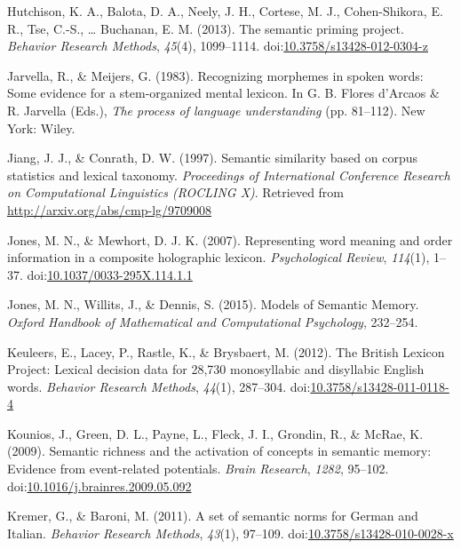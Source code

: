 \documentclass[english,,man]{apa6}
\begin{document}
\leavevmode\hypertarget{ref-Hutchison2013}{}%
Hutchison, K. A., Balota, D. A., Neely, J. H., Cortese, M. J., Cohen-Shikora, E. R., Tse, C.-S., \ldots{} Buchanan, E. M. (2013). The semantic priming project. \emph{Behavior Research Methods}, \emph{45}(4), 1099--1114. doi:\href{https://doi.org/10.3758/s13428-012-0304-z}{10.3758/s13428-012-0304-z}

\leavevmode\hypertarget{ref-Jarvella1983}{}%
Jarvella, R., \& Meijers, G. (1983). Recognizing morphemes in spoken words: Some evidence for a stem-organized mental lexicon. In G. B. Flores d'Arcaos \& R. Jarvella (Eds.), \emph{The process of language understanding} (pp. 81--112). New York: Wiley.

\leavevmode\hypertarget{ref-Jiang1997}{}%
Jiang, J. J., \& Conrath, D. W. (1997). Semantic similarity based on corpus statistics and lexical taxonomy. \emph{Proceedings of International Conference Research on Computational Linguistics (ROCLING X)}. Retrieved from \url{http://arxiv.org/abs/cmp-lg/9709008}

\leavevmode\hypertarget{ref-Jones2007}{}%
Jones, M. N., \& Mewhort, D. J. K. (2007). Representing word meaning and order information in a composite holographic lexicon. \emph{Psychological Review}, \emph{114}(1), 1--37. doi:\href{https://doi.org/10.1037/0033-295X.114.1.1}{10.1037/0033-295X.114.1.1}

\leavevmode\hypertarget{ref-Jones2015a}{}%
Jones, M. N., Willits, J., \& Dennis, S. (2015). Models of Semantic Memory. \emph{Oxford Handbook of Mathematical and Computational Psychology}, 232--254.

\leavevmode\hypertarget{ref-Keuleers2012}{}%
Keuleers, E., Lacey, P., Rastle, K., \& Brysbaert, M. (2012). The British Lexicon Project: Lexical decision data for 28,730 monosyllabic and disyllabic English words. \emph{Behavior Research Methods}, \emph{44}(1), 287--304. doi:\href{https://doi.org/10.3758/s13428-011-0118-4}{10.3758/s13428-011-0118-4}

\leavevmode\hypertarget{ref-Kounios2009}{}%
Kounios, J., Green, D. L., Payne, L., Fleck, J. I., Grondin, R., \& McRae, K. (2009). Semantic richness and the activation of concepts in semantic memory: Evidence from event-related potentials. \emph{Brain Research}, \emph{1282}, 95--102. doi:\href{https://doi.org/10.1016/j.brainres.2009.05.092}{10.1016/j.brainres.2009.05.092}

\leavevmode\hypertarget{ref-Kremer2011a}{}%
Kremer, G., \& Baroni, M. (2011). A set of semantic norms for German and Italian. \emph{Behavior Research Methods}, \emph{43}(1), 97--109. doi:\href{https://doi.org/10.3758/s13428-010-0028-x}{10.3758/s13428-010-0028-x}
\end{document}
